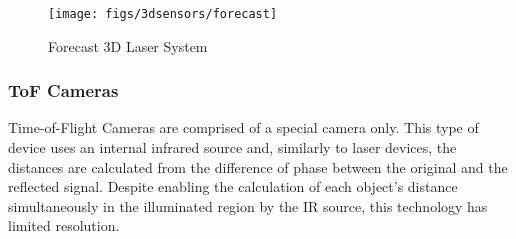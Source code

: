 \begin{figure}[h!]
   \centering
   \texttt{[image: figs/3dsensors/forecast]}
   \caption{Forecast 3D Laser System}
   \label{fig::forecast}
\end{figure}

\subsubsection{ToF Cameras}

Time-of-Flight Cameras are comprised of a special camera only. This type of
device uses an internal infrared source and, similarly to laser devices, the
distances are calculated from the difference of phase between the original and
the reflected signal.
Despite enabling the calculation of each object's distance simultaneously  in
the illuminated region by the IR source, this technology has limited resolution.


% 
% 
% 

